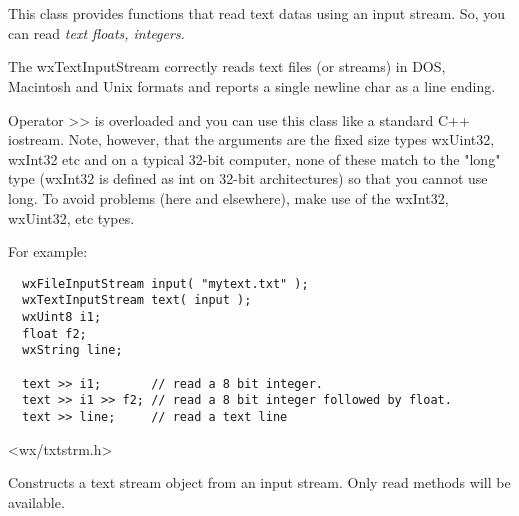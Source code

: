 \section{}\label{wxtextinputstream}

This class provides functions that read text datas using an input stream.
So, you can read \it{text} floats, integers.

The wxTextInputStream correctly reads text files (or streams) in DOS, Macintosh
and Unix formats and reports a single newline char as a line ending.

Operator >> is overloaded and you can use this class like a standard C++ iostream.
Note, however, that the arguments are the fixed size types wxUint32, wxInt32 etc
and on a typical 32-bit computer, none of these match to the "long" type (wxInt32
is defined as int on 32-bit architectures) so that you cannot use long. To avoid
problems (here and elsewhere), make use of the wxInt32, wxUint32, etc types.

For example:
\begin{verbatim}
  wxFileInputStream input( "mytext.txt" );
  wxTextInputStream text( input );
  wxUint8 i1;
  float f2;
  wxString line;

  text >> i1;       // read a 8 bit integer.
  text >> i1 >> f2; // read a 8 bit integer followed by float.
  text >> line;     // read a text line
\end{verbatim}


<wx/txtstrm.h>


\label{wxtextinputstreamconstr}


Constructs a text stream object from an input stream. Only read methods will
be available.





